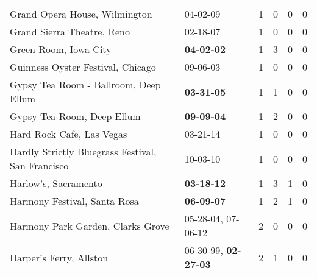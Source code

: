 \begin{longtable}{p{}p{}p{}p{}p{}p{}}
                                                Grand Opera House, Wilmington &                                                04-02-09\textsuperscript{} &  1 &  0 &  0 &  0 \\
                                                   Grand Sierra Theatre, Reno &                                                02-18-07\textsuperscript{} &  1 &  0 &  0 &  0 \\
                                                        Green Room, Iowa City &                                       \textbf{04-02-02\textsuperscript{}} &  1 &  3 &  0 &  0 \\
                                            Guinness Oyster Festival, Chicago &                                                09-06-03\textsuperscript{} &  1 &  0 &  0 &  0 \\
                                        Gypsy Tea Room - Ballroom, Deep Ellum &                                       \textbf{03-31-05\textsuperscript{}} &  1 &  1 &  0 &  0 \\
                                                   Gypsy Tea Room, Deep Ellum &                                       \textbf{09-09-04\textsuperscript{}} &  1 &  2 &  0 &  0 \\
                                                    Hard Rock Cafe, Las Vegas &                                                03-21-14\textsuperscript{} &  1 &  0 &  0 &  0 \\
                            Hardly Strictly Bluegrass Festival, San Francisco &                                                10-03-10\textsuperscript{} &  1 &  0 &  0 &  0 \\
                                                         Harlow's, Sacramento &                                       \textbf{03-18-12\textsuperscript{}} &  1 &  3 &  1 &  0 \\
                                                 Harmony Festival, Santa Rosa &                                       \textbf{06-09-07\textsuperscript{}} &  1 &  2 &  1 &  0 \\
                                            Harmony Park Garden, Clarks Grove &                    05-28-04\textsuperscript{}, 07-06-12\textsuperscript{} &  2 &  0 &  0 &  0 \\
                                                      Harper's Ferry, Allston &           06-30-99\textsuperscript{}, \textbf{02-27-03\textsuperscript{}} &  2 &  1 &  0 &  0 \\

\end{longtable}
